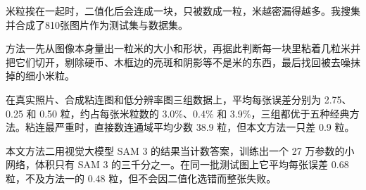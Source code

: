 米粒挨在一起时，二值化后会连成一块，只被数成一粒，米越密漏得越多。我搜集并合成了810张图片作为测试集与数据集。

方法一先从图像本身量出一粒米的大小和形状，再据此判断每一块里粘着几粒米并把它们切开，剔除硬币、木框边的亮斑和阴影等不是米的东西，最后找回被去噪抹掉的细小米粒。

在真实照片、合成粘连图和低分辨率图三组数据上，平均每张误差分别为 2.75、0.25 和 0.50 粒，约占每张米粒数的 3.0\%、0.4\% 和 3.9\%，三组都优于五种经典方法。粘连最严重时，直接数连通域平均少数 38.9 粒，但本文方法一只差 0.9 粒。

本文方法二用视觉大模型 SAM 3 的结果当计数答案，训练出一个 27 万参数的小网络，体积只有 SAM 3 的三千分之一。在同一批测试图上它平均每张误差 0.68 粒，不及方法一的 0.48 粒，但不会因二值化选错而整张失败。
